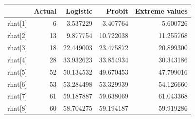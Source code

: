 \documentclass[]{article}
\newenvironment{Shaded}{\begin{snugshade}}{\end{snugshade}}
\newcommand{\DataTypeTok}[1]{\textcolor[rgb]{0.13,0.29,0.53}{#1}}
\newcommand{\DecValTok}[1]{\textcolor[rgb]{0.00,0.00,0.81}{#1}}
\newcommand{\KeywordTok}[1]{\textcolor[rgb]{0.13,0.29,0.53}{\textbf{#1}}}
\newcommand{\NormalTok}[1]{#1}
\newcommand{\OperatorTok}[1]{\textcolor[rgb]{0.81,0.36,0.00}{\textbf{#1}}}
\newcommand{\StringTok}[1]{\textcolor[rgb]{0.31,0.60,0.02}{#1}}
\begin{document}
\begin{Shaded}
\end{Shaded}

\begin{table}[!h]
\centering
\begin{tabular}{lrrrr}
\toprule
  & Actual & Logistic & Probit & Extreme values\\
\midrule
\rowcolor{gray!6}  rhat[1] & 6 & 3.537229 & 3.407764 & 5.600726\\
rhat[2] & 13 & 9.877754 & 10.722038 & 11.255768\\
\rowcolor{gray!6}  rhat[3] & 18 & 22.449003 & 23.475872 & 20.899300\\
rhat[4] & 28 & 33.932623 & 33.854934 & 30.343186\\
\rowcolor{gray!6}  rhat[5] & 52 & 50.134532 & 49.670453 & 47.799016\\
\addlinespace
rhat[6] & 53 & 53.284498 & 53.329939 & 54.126660\\
\rowcolor{gray!6}  rhat[7] & 61 & 59.187887 & 59.638069 & 61.043368\\
rhat[8] & 60 & 58.704275 & 59.194187 & 59.919286\\
\bottomrule
\end{tabular}
\end{table}
\end{document}

